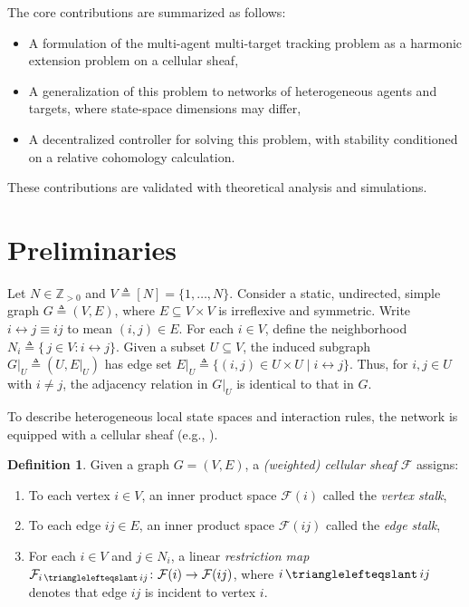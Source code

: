 \documentclass[letterpaper, 10 pt, conference]{ieeeconf}
\newcommand{\maps}{\colon}
\newcommand{\define}[1]{\emph{#1}}
\DeclareMathOperator{\face}{\trianglelefteqslant}
\theoremstyle{definition}
\newtheorem{definition}{Definition}
\begin{document}
The core contributions are summarized as follows:
\begin{itemize}
    \item A formulation of the multi-agent multi-target tracking problem as a harmonic extension problem on a cellular sheaf,
    \item A generalization of this problem to networks of heterogeneous agents and targets, where state-space dimensions may differ,
    \item A decentralized controller for solving this problem, with stability conditioned on a relative cohomology calculation.
\end{itemize}

These contributions are validated with theoretical analysis and simulations.

\section{Preliminaries}
Let $N\in\mathbb{Z}_{>0}$ and $V\triangleq[N]=\{1,\ldots,N\}$. Consider a static, undirected, simple graph $G\triangleq(V,E)$, where $E\subseteq V\times V$ is irreflexive and symmetric. Write $i\leftrightarrow j \equiv ij$ to mean $(i,j)\in E$. For each $i\in V$, define the neighborhood $N_{i}\triangleq\{\,j\in V: i\leftrightarrow j\}$. Given a subset \(U\subseteq V\), the induced subgraph \(G|_{U}\triangleq(U,E|_{U})\) has edge set \(E|_{U}\triangleq\{(i,j)\in U\times U\mid i\leftrightarrow j\}\). Thus, for \(i,j\in U\) with \(i\neq j\), the adjacency relation in \(G|_{U}\) is identical to that in \(G\).

To describe heterogeneous local state spaces and interaction rules, the network is equipped with a cellular sheaf (e.g., \cite{Hansen.Jakob2020a,Hansen.Jakob2021}).

\begin{definition} \label{def:cellular-sheaf}
Given a graph $G = (V,E)$, a \define{(weighted) cellular sheaf} $\mathcal{F}$ assigns:
\begin{enumerate}
    \item[(a)] To each vertex $i\in V$, an inner product space $\mathcal{F}(i)$ called the \define{vertex stalk},%
    \item[(b)] To each edge $ij\in E$, an inner product space $\mathcal{F}(ij)$ called the \define{edge stalk}, %
    \item[(c)] For each $i\in V$ and $j\in N_i$, a linear \define{restriction map} $\mathcal{F}_{i\face ij}\maps\mathcal{F}(i) \rightarrow \mathcal{F}(ij)$, where $i\face ij$ denotes that edge $ij$ is incident to vertex $i$.
\end{enumerate}
\end{definition}
\end{document}
